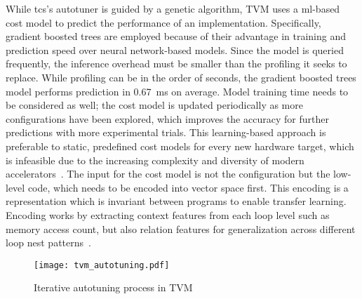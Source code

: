 While \glspl{tc}'s autotuner is guided by a genetic algorithm, TVM uses a \gls{ml}-based cost model to predict the performance of an implementation. Specifically, gradient boosted trees are employed because of their advantage in training and prediction speed over neural network-based models. Since the model is queried frequently, the inference overhead must be smaller than the profiling it seeks to replace. While profiling can be in the order of seconds, the gradient boosted trees model performs prediction in \SI{0.67}{\milli\second} on average. Model training time needs to be considered as well; the cost model is updated periodically as more configurations have been explored, which improves the accuracy for further predictions with more experimental trials. This learning-based approach is preferable to static, predefined cost models for every new hardware target, which is infeasible due to the increasing complexity and diversity of modern accelerators~\cite[p.~8~f.]{Chen.2018b}. The input for the cost model is not the configuration but the low-level code, which needs to be encoded into vector space first. This encoding is a representation which is invariant between programs to enable transfer learning. Encoding works by extracting context features from each loop level such as memory access count, but also relation features for generalization across different loop nest patterns~\cite[p.~4]{Chen.2018}.

\begin{figure}
	\centering
	\texttt{[image: tvm\_autotuning.pdf]}%
	\caption{Iterative autotuning process in TVM}
	\label{fig:tvm-autotuning}
\end{figure}


